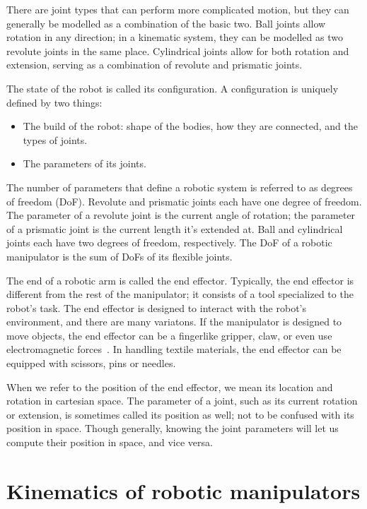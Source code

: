 There are joint types that can perform more complicated motion, but they can generally be modelled as a combination of the basic two. Ball joints allow rotation in any direction; in a kinematic system, they can be modelled as two revolute joints in the same place. Cylindrical joints allow for both rotation and extension, serving as a combination of revolute and prismatic joints.

The state of the robot is called its configuration. A configuration is uniquely defined by two things:
\begin{itemize}
  \item The build of the robot: shape of the bodies, how they are connected, and the types of joints.
  \item The parameters of its joints.
\end{itemize}

The number of parameters that define a robotic system is referred to as degrees of freedom (DoF). Revolute and prismatic joints each have one degree of freedom. The parameter of a revolute joint is the current angle of rotation; the parameter of a prismatic joint is the current length it's extended at. Ball and cylindrical joints each have two degrees of freedom, respectively. The DoF of a robotic manipulator is the sum of DoFs of its flexible joints.

The end of a robotic arm is called the end effector. Typically, the end effector is different from the rest of the manipulator; it consists of a tool specialized to the robot's task. The end effector is designed to interact with the robot's environment, and there are many variatons. If the manipulator is designed to move objects, the end effector can be a fingerlike gripper, claw, or even use electromagnetic forces~\cite{grippers}. In handling textile materials, the end effector can be equipped with scissors, pins or needles.

When we refer to the position of the end effector, we mean its location and rotation in cartesian space. The parameter of a joint, such as its current rotation or extension, is sometimes called its position as well; not to be confused with its position in space. Though  generally, knowing the joint parameters will let us compute their position in space, and vice versa.

\section{Kinematics of robotic manipulators}

